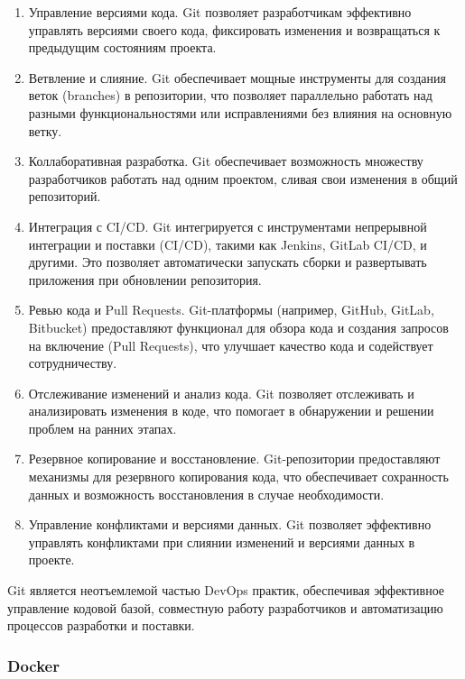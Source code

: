 \documentclass[referat]{SCWorks}
\begin{document}
\begin{enumerate}
\item Управление версиями кода. Git позволяет разработчикам эффективно управлять версиями своего кода, фиксировать изменения и возвращаться к предыдущим состояниям проекта.

\item Ветвление и слияние. Git обеспечивает мощные инструменты для создания веток (branches) в репозитории, что позволяет параллельно работать над разными функциональностями или исправлениями без влияния на основную ветку.

\item Коллаборативная разработка. Git обеспечивает возможность множеству разработчиков работать над одним проектом, сливая свои изменения в общий репозиторий.

\item Интеграция с CI/CD. Git интегрируется с инструментами непрерывной интеграции и поставки (CI/CD), такими как Jenkins, GitLab CI/CD, и другими. Это позволяет автоматически запускать сборки и развертывать приложения при обновлении репозитория.

\item Ревью кода и Pull Requests. Git-платформы (например, GitHub, GitLab, Bitbucket) предоставляют функционал для обзора кода и создания запросов на включение (Pull Requests), что улучшает качество кода и содействует сотрудничеству.

\item Отслеживание изменений и анализ кода. Git позволяет отслеживать и анализировать изменения в коде, что помогает в обнаружении и решении проблем на ранних этапах.

\item Резервное копирование и восстановление. Git-репозитории предоставляют механизмы для резервного копирования кода, что обеспечивает сохранность данных и возможность восстановления в случае необходимости.

\item Управление конфликтами и версиями данных. Git позволяет эффективно управлять конфликтами при слиянии изменений и версиями данных в проекте.
\end{enumerate}

Git является неотъемлемой частью DevOps практик, обеспечивая эффективное управление кодовой базой, совместную работу разработчиков и автоматизацию процессов разработки и поставки.

\subsubsection{Docker}
\end{document}
